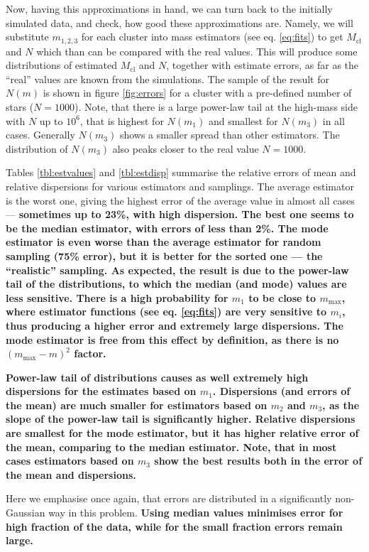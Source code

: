 \documentclass{aastex}
\newcommand{\Mmax}{m_{\mathrm{max}}}
\newcommand{\Mcl}{M_{\mathrm{cl}}}
\begin{document}
Now, having this approximations in hand, we can turn back to the initially simulated data, and check, how good these approximations are. Namely, we will substitute $m_{1,2,3}$ for each cluster into mass estimators (see eq. \ref{eq:fits}) to get $\Mcl$ and $N$ which than can be compared with the real values. This will produce some distributions of estimated $\Mcl$ and $N$, together with estimate errors, as far as the ``real'' values are known from the simulations. The sample of the result for $N(m)$ is shown in figure \ref{fig:errors} for a cluster with a pre-defined number of stars ($N=1000$).
Note, that there is a large power-law tail at the high-mass side with $N$ up to $10^6$, that is highest for $N(m_1)$ and smallest for $N(m_3)$ in all cases. Generally $N(m_3)$ shows a smaller spread than other estimators. The distribution of $N(m_3)$ also peaks closer to the real value $N=1000$. 

Tables \ref{tbl:estvalues} and \ref{tbl:estdisp} summarise the relative errors of mean and relative dispersions for various estimators 
and samplings. 
The average estimator is the worst one, giving the highest error of the average value in almost all cases --- \textbf{sometimes up to 23\%,
with high dispersion.
The best one seems to be the median estimator, with errors of less than 2\%. 
The mode estimator is even worse than the average estimator for random sampling (75\% error), but it is better for the sorted one --- the ``realistic'' sampling.
As expected, the result is due to the power-law tail of the distributions, to which the median (and mode) values are less sensitive. There is a high probability for $m_1$ to be close to $\Mmax$, where estimator functions (see eq. \ref{eq:fits}) are very sensitive to $m_i$, thus producing a higher error and extremely large dispersions. The mode estimator is free from this effect by definition, as there is no $(\Mmax-m)^2$ factor.}

\textbf{Power-law tail of distributions causes as well extremely high dispersions for the estimates based on $m_1$. Dispersions (and errors of the mean) are much smaller for estimators based on $m_2$ and $m_3$, as the slope of the power-law tail is significantly higher. Relative dispersions are smallest for the mode estimator, but it has higher relative error of the mean, comparing to the median estimator.
Note, that in most cases estimators based on $m_3$ show the best results both in the error of the mean and dispersions.}

Here we emphasise once again, that errors are distributed in a significantly non-Gaussian way in this problem. \textbf{Using median values minimises error for high fraction of the data, while for the small fraction errors remain large. }
\end{document}
